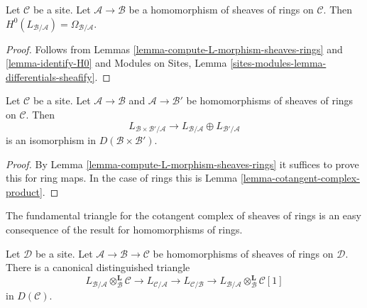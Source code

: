 \begin{lemma}
\label{lemma-H0-L-morphism-sheaves-rings}
Let $\mathcal{C}$ be a site. Let $\mathcal{A} \to \mathcal{B}$ be a
homomorphism of sheaves of rings on $\mathcal{C}$. Then
$H^0(L_{\mathcal{B}/\mathcal{A}}) = \Omega_{\mathcal{B}/\mathcal{A}}$.
\end{lemma}

\begin{proof}
Follows from Lemmas \ref{lemma-compute-L-morphism-sheaves-rings}
and \ref{lemma-identify-H0} and
Modules on Sites, Lemma \ref{sites-modules-lemma-differentials-sheafify}.
\end{proof}

\begin{lemma}
\label{lemma-compute-L-product-sheaves-rings}
Let $\mathcal{C}$ be a site. Let $\mathcal{A} \to \mathcal{B}$
and $\mathcal{A} \to \mathcal{B}'$ be homomorphisms of sheaves of rings
on $\mathcal{C}$. Then
$$
L_{\mathcal{B} \times \mathcal{B}'/\mathcal{A}}
\longrightarrow
L_{\mathcal{B}/\mathcal{A}} \oplus L_{\mathcal{B}'/\mathcal{A}}
$$
is an isomorphism in $D(\mathcal{B} \times \mathcal{B}')$.
\end{lemma}

\begin{proof}
By Lemma \ref{lemma-compute-L-morphism-sheaves-rings}
it suffices to prove this for ring maps.
In the case of rings this is
Lemma \ref{lemma-cotangent-complex-product}.
\end{proof}

\noindent
The fundamental triangle for the cotangent complex of sheaves of rings
is an easy consequence of the result for homomorphisms of rings.

\begin{lemma}
\label{lemma-triangle-sheaves-rings}
Let $\mathcal{D}$ be a site. Let $\mathcal{A} \to \mathcal{B} \to \mathcal{C}$
be homomorphisms of sheaves of rings on $\mathcal{D}$.
There is a canonical distinguished triangle
$$
L_{\mathcal{B}/\mathcal{A}} \otimes_\mathcal{B}^\mathbf{L} \mathcal{C}
\to L_{\mathcal{C}/\mathcal{A}} \to L_{\mathcal{C}/\mathcal{B}} \to
L_{\mathcal{B}/\mathcal{A}} \otimes_\mathcal{B}^\mathbf{L} \mathcal{C}[1]
$$
in $D(\mathcal{C})$.
\end{lemma}

